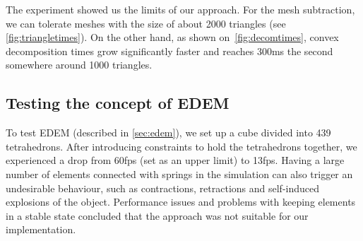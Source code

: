 The experiment showed us the limits of our approach. For the mesh subtraction, we can tolerate meshes with the size of about 2000 triangles (see \cref{fig:triangletimes}).  On the other hand, as shown on~\cref{fig:decomtimes}, convex decomposition times grow significantly faster and reaches 300ms the second somewhere around 1000 triangles.


\subsection{Testing the concept of EDEM}
To test EDEM (described in \cref{sec:edem}), we set up a cube divided into 439 tetrahedrons. After introducing constraints to hold the tetrahedrons together, we experienced a drop from 60fps (set as an upper limit) to 13fps. Having a large number of elements connected with springs in the simulation can also trigger an undesirable behaviour, such as contractions, retractions and self-induced explosions of the object. Performance issues and problems with keeping elements in a stable state concluded that the approach was not suitable for our implementation.




